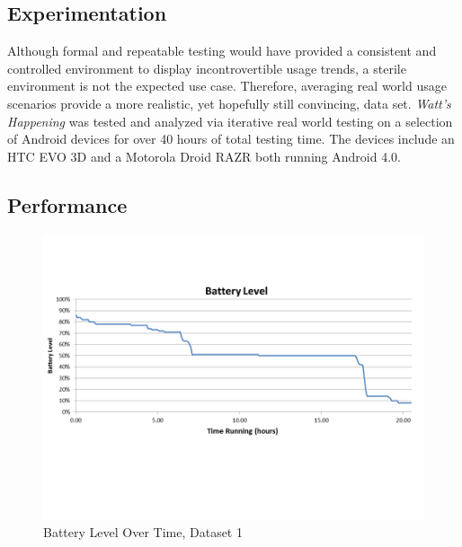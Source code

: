\subsection{Experimentation}
Although formal and repeatable testing would have provided a consistent and controlled environment to display incontrovertible usage trends, a sterile environment is not the expected use case.
Therefore, averaging real world usage scenarios provide a more realistic, yet hopefully still convincing, data set.
\emph{Watt's Happening} was tested and analyzed via iterative real world testing on a selection of Android devices for over 40 hours of total testing time.
The devices include an HTC EVO 3D and a Motorola Droid RAZR both running Android 4.0. 


\subsection{Performance}
\begin{figure}[h]
	\begin{center}
		\includegraphics[scale=0.5]{figs/battery_level.png}
		\caption{Battery Level Over Time, Dataset 1}
		\label{fig:bat_level}
\end{center}
\end{figure}
